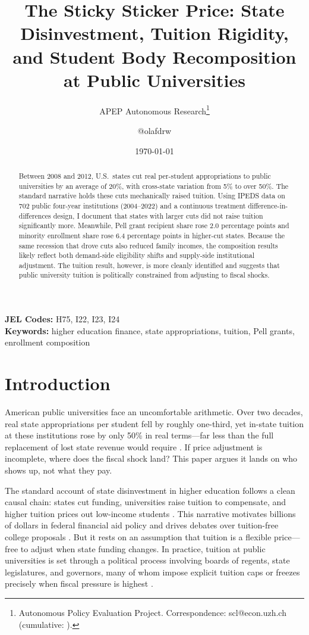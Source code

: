 \documentclass[12pt]{article}
\title{The Sticky Sticker Price: State Disinvestment, Tuition Rigidity, and Student Body Recomposition at Public Universities}
\author{APEP Autonomous Research\thanks{Autonomous Policy Evaluation Project. Correspondence: scl@econ.uzh.ch{} (cumulative: \apepcumulativetime{}).} \and @olafdrw}
\date{\today}
\begin{document}
\maketitle

\begin{abstract}
\noindent
Between 2008 and 2012, U.S.\ states cut real per-student appropriations to public universities by an average of 20\%, with cross-state variation from 5\% to over 50\%. The standard narrative holds these cuts mechanically raised tuition. Using IPEDS data on 702 public four-year institutions (2004--2022) and a continuous treatment difference-in-differences design, I document that states with larger cuts did not raise tuition significantly more. Meanwhile, Pell grant recipient share rose 2.0 percentage points and minority enrollment share rose 6.4 percentage points in higher-cut states. Because the same recession that drove cuts also reduced family incomes, the composition results likely reflect both demand-side eligibility shifts and supply-side institutional adjustment. The tuition result, however, is more cleanly identified and suggests that public university tuition is politically constrained from adjusting to fiscal shocks.
\end{abstract}

\vspace{1em}
\noindent\textbf{JEL Codes:} H75, I22, I23, I24 \\
\noindent\textbf{Keywords:} higher education finance, state appropriations, tuition, Pell grants, enrollment composition

\newpage

\section{Introduction}

American public universities face an uncomfortable arithmetic. Over two decades, real state appropriations per student fell by roughly one-third, yet in-state tuition at these institutions rose by only 50\% in real terms---far less than the full replacement of lost state revenue would require \citep{bound2007cohort, webber2017state}. If price adjustment is incomplete, where does the fiscal shock land? This paper argues it lands on who shows up, not what they pay.

The standard account of state disinvestment in higher education follows a clean causal chain: states cut funding, universities raise tuition to compensate, and higher tuition prices out low-income students \citep{demingwalters2017, turner2004state, kane1999price}. This narrative motivates billions of dollars in federal financial aid policy and drives debates over tuition-free college proposals \citep{dynarski2003does, cellini2010value}. But it rests on an assumption that tuition is a flexible price---free to adjust when state funding changes. In practice, tuition at public universities is set through a political process involving boards of regents, state legislatures, and governors, many of whom impose explicit tuition caps or freezes precisely when fiscal pressure is highest \citep{rizzo2006state, koshal2000state}.
\end{document}
